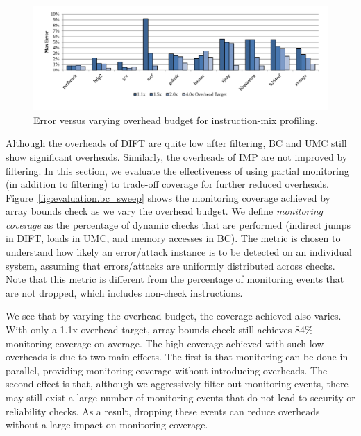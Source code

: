 \begin{figure}
  \begin{center}
    \includegraphics[width=\linewidth]{figs/data_imp_sweep.pdf}
    \vspace{-0.2in}
    \caption{Error versus varying overhead budget for instruction-mix profiling.}
    \label{fig:evaluation.imp_sweep}
    \vspace{-0.1in}
  \end{center}
\end{figure}

Although the overheads of DIFT are quite low after filtering, BC and UMC still
show significant overheads. Similarly, the overheads of IMP are not improved by filtering. In this section, we evaluate the effectiveness of
using partial monitoring (in addition to filtering) to trade-off coverage for further reduced overheads.
Figure~\ref{fig:evaluation.bc_sweep} shows the monitoring coverage achieved by
array bounds check as we vary the overhead budget. 
We define \emph{monitoring coverage} as the 
percentage of dynamic checks that are performed 
(indirect jumps in DIFT, loads in UMC, and memory accesses in BC). 
The metric is chosen to understand
how likely an error/attack instance is to be detected on an individual system, 
assuming that errors/attacks are uniformly distributed across checks. 
Note that this metric is different from the
percentage of monitoring events that are not dropped, which includes
non-check instructions.

We see that by varying the overhead budget, the coverage achieved also varies.
With only a 1.1x overhead target, array bounds check still
achieves 84\% monitoring coverage on average. The high coverage
achieved with such low overheads is due to two main effects.  The first is that
monitoring can be done in parallel, providing monitoring coverage without
introducing overheads. The second effect is that, although we aggressively
filter out monitoring events, there may still exist a large number of
monitoring events that do not lead to security or reliability checks. As a
result, dropping these events can reduce overheads without a large impact on
monitoring coverage.

